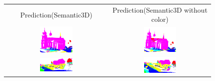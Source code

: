     \begin{figure}[h!]
        \centering
        \begin{tabular}{cc}
            Prediction(Semantic3D) & Prediction(Semantic3D without color) \\
            \includegraphics[width=0.33\textwidth, height=0.18\textheight]{images/ood_imgs/fout_sem3d/fout_1.png}&
            \includegraphics[width=0.33\textwidth, height=0.18\textheight]{images/sem3d_of/fout_sem3d_of_1.png}\\

            \includegraphics[width=0.33\textwidth, height=0.18\textheight]{images/ood_imgs/fout_sem3d/fout_2.png}&
            \includegraphics[width=0.33\textwidth, height=0.18\textheight]{images/sem3d_of/fout_sem3d_of_2.png}\\


\end{tabular}
\end{figure}
